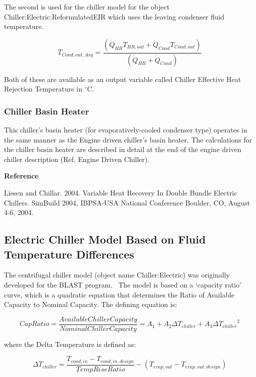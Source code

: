 The second is used for the chiller model for the object Chiller:Electric:ReformulatedEIR which uses the leaving condenser fluid temperature.

\begin{equation}
{T_{Cond,out,Avg}} = \frac{{\left( {{{\dot Q}_{HR}}{T_{HR,out}} + {{\dot Q}_{Cond}}{T_{Cond,out}}} \right)}}{{\left( {{{\dot Q}_{HR}} + {{\dot Q}_{Cond}}} \right)}}
\end{equation}

Both of these are available as an output variable called Chiller Effective Heat Rejection Temperature in \(^{\circ}\)C.

\subsubsection{Chiller Basin Heater}\label{chiller-basin-heater-2}

This chiller's basin heater (for evaporatively-cooled condenser type) operates in the same manner as the Engine driven chiller's basin heater. The calculations for the chiller basin heater are described in detail at the end of the engine driven chiller description (Ref. Engine Driven Chiller).

\textbf{Reference}

Liesen and Chillar. 2004. Variable Heat Recovery In Double Bundle Electric Chillers. SimBuild 2004, IBPSA-USA National Conference Boulder, CO, August 4-6, 2004.

\subsection{Electric Chiller Model Based on Fluid Temperature Differences}\label{electric-chiller-model-based-on-fluid-temperature-differences}

The centrifugal chiller model (object name Chiller:Electric) was originally developed for the BLAST program.~ The model is based on a `capacity ratio' curve, which is a quadratic equation that determines the Ratio of Available Capacity to Nominal Capacity. The defining equation is:

\begin{equation}
CapRatio = \frac{{Available Chiller Capacity}}{{Nominal Chiller Capacity}} = {A_1} + {A_2}\Delta {T_{chiller}} + {A_3}\Delta {T_{chiller}}^2
\end{equation}

where the Delta Temperature is defined as:

\begin{equation}
\Delta {T_{chiller}} = \frac{{{T_{cond, in}} - {T_{cond,in,design}}}}{{TempRiseRatio}} - \left( {{T_{evap,out}} - {T_{evap,out,design}}} \right)
\end{equation}

